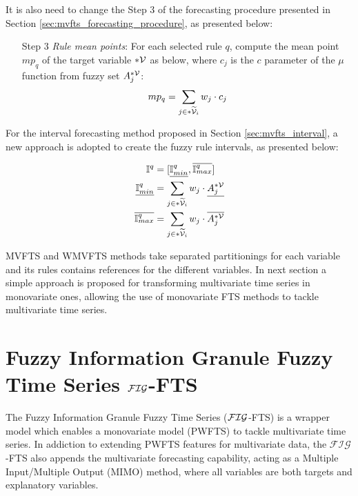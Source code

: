 It is also need to change the Step 3 of the forecasting procedure presented in Section \ref{sec:mvfts_forecasting_procedure}, as presented below:

\begin{enumerate}
    \item [Step 3] \textit{Rule mean points}: For each selected rule $q$, compute the mean point $mp_q$ of the target variable $*\mathcal{V}$ as below, where $c_j$ is the $c$ parameter of the $\mu$ function from fuzzy set $A_j^{*\mathcal{V}}$:
\begin{equation}
mp_q = \sum_{j \in *\widetilde{\mathcal{V}}_i} w_j \cdot c_j
\end{equation}
\end{enumerate}

For the interval forecasting method proposed in Section \ref{sec:mvfts_interval}, a new approach is adopted to create the fuzzy rule intervals, as presented below:

\begin{align}
    \mathbb{I}^q & =  [\underline{\mathbb{I}^q_{min}}, \overline{\mathbb{I}^q_{max}}] \\
    \underline{\mathbb{I}^q_{min}} &= \sum_{j \in *\widetilde{\mathcal{V}}_i} w_j \cdot \underline{A_j^{*\mathcal{V}}} \\
    \overline{\mathbb{I}^q_{max}} &= \sum_{j \in *\widetilde{\mathcal{V}}_i} w_j \cdot \overline{A_j^{*\mathcal{V}}} 
\end{align}

MVFTS and WMVFTS methods take separated partitionings for each variable and its rules contains references for the different variables.  In next section a simple approach is proposed for transforming multivariate time series in monovariate ones, allowing the use of monovariate FTS methods to tackle multivariate time series.

\section{Fuzzy Information Granule Fuzzy Time Series  $\mathcal{FIG}$-FTS}
\label{sec:fig_fts}

The Fuzzy Information Granule Fuzzy Time Series ($\mathcal{FIG}$-FTS) is a wrapper model which enables a monovariate model (PWFTS) to tackle multivariate time series. In addiction to extending PWFTS features for multivariate data, the $\mathcal{FIG}$-FTS also appends the multivariate forecasting capability, acting as a Multiple Input/Multiple Output (MIMO) method, where all variables are both targets and explanatory variables. 

